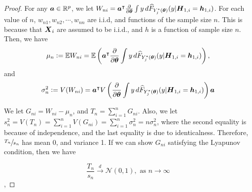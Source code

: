 \begin{proof}
	For any  $\boldsymbol{a} \in \mathbb{R}^p$, we let $W_{ni} = \bs{a}^\itl \pard[\bs{\theta}]\int y \,d  \wh{F}_{Y_j^*(\bs{\theta})}(y | \bs{H}_{1,i} = \bs{h}_{1,i})$. For each value of $n$, $w_{n1},w_{n2},\cdots,w_{nn}$ are i.i.d, and functions of the sample size $n$. This is because that $\boldsymbol{X}_{i}$ are assumed to be i.i.d., and $h$ is a function of sample
	size $n$. Then, we have
	\begin{gather*}
	\mu_{n}:=\mathbb{E}W_{ni}=\mathbb{E}\lt(\bs{a}^\itl \pard[\bs{\theta}]\int y \,d  \wh{F}_{Y_j^*(\bs{\theta})}(y | \bs{H}_{1,i} = \bs{h}_{1,i})\rt),
	\end{gather*}
	and
	\begin{gather*}
	\sigma_{n}^{2}:=V(W_{ni})=\bs{a}^\itl V\lt(\pard[\bs{\theta}]\int y \,d  \wh{F}_{Y_j^*(\bs{\theta})}(y | \bs{H}_{1,i} = \bs{h}_{1,i}) \rt)\bs{a}
	\end{gather*}
	
	We let $G_{ni}=W_{ni}-\mu_{\ensuremath{n}}$, and $T_{n}=\sum_{i=1}^{n}G_{ni}$. Also, we let $s_{n}^{2}=V(T_{n})=\sum_{i=1}^{n}V(G_{ni})=\sum_{i=1}^{n}\sigma_{n}^{2}=n\sigma_{n}^{2}$, where the second equality is because of independence, and the last equality is due to identicalness. Therefore, $\sfrac{T_{n}}{s_{n}}$ has mean 0, and variance 1.  If we can show $G_{ni}$ satisfying the Lyapunov condition, then
	we have
	
	$$\frac{T_{n}}{s_{n}}\overset{d}{\to}\mathcal{N}(0,1),\text{ as } n \to \infty$$,
	
	
	

\end{proof}
